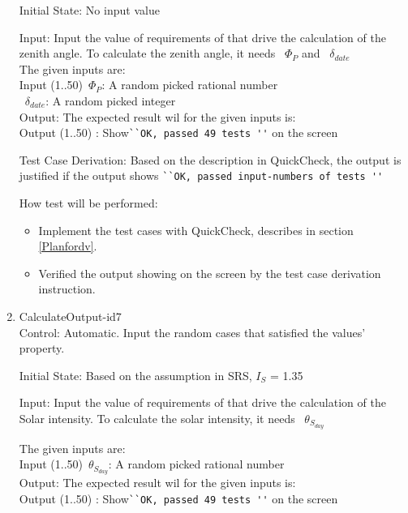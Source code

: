 \documentclass[12pt, titlepage]{article}
\begin{document}
\begin{enumerate}
Initial State: No input value

Input: Input the value of requirements of \progname that drive the calculation
of the zenith angle. To calculate the zenith angle, it needs 
~$\Phi_P$ and ~$\delta_{date}$\\ 

The given inputs are:\\ 
Input (1..50)~$\Phi_P$: A random picked rational number\\ 
~$\delta_{date}$: A random picked integer\\

Output: The expected result wil for the given inputs is:\\ 
Output (1..50) : Show\verb|``OK, passed 49 tests ''| on the screen\\


Test Case Derivation: Based on the description in QuickCheck\cite{QuickCheck},
the output is justified if the output shows \verb|``OK, passed input-numbers of tests ''|

How test will be performed: 
\begin{itemize} 
\item Implement the test cases with QuickCheck\cite{QuickCheck}, describes in 
section \ref{Planfordv}.
\item Verified the output showing on the screen by the test case derivation
instruction.
\end{itemize} 

\item{CalculateOutput-id7\\}
Control: Automatic. Input the random cases that satisfied the values' property.

Initial State: Based on the assumption in SRS\cite{YS2019}, $I_{S}$ = 1.35

Input: Input the value of requirements of \progname that drive the calculation
of the Solar intensity. To calculate the solar intensity, it needs
~$\theta_{S_{day}}$

The given inputs are:\\ 
Input (1..50)~$\theta_{S_{day}}$: A random picked rational number\\

Output: The expected result wil for the given inputs is:\\ 
Output (1..50) : Show\verb|``OK, passed 49 tests ''| on the screen\\


\end{enumerate}
\end{document}

